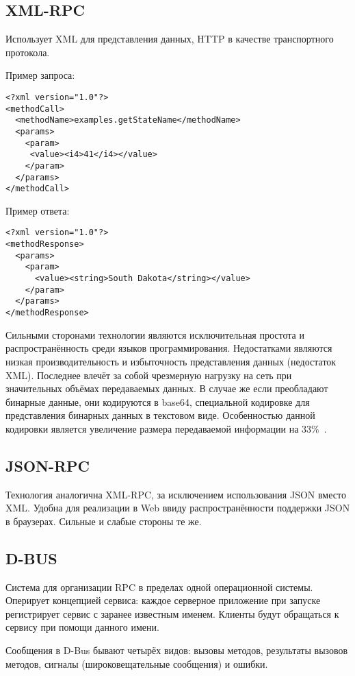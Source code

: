 \subsection{XML-RPC}
Использует XML для представления данных, HTTP в качестве транспортного протокола.

\noindent Пример запроса:
\begin{verbatim}
<?xml version="1.0"?>
<methodCall>
  <methodName>examples.getStateName</methodName>
  <params>
    <param>
     <value><i4>41</i4></value>
    </param>
  </params>
</methodCall>
\end{verbatim}

\noindent Пример ответа:
\begin{verbatim}
<?xml version="1.0"?>
<methodResponse>
  <params>
    <param>
      <value><string>South Dakota</string></value>
    </param>
  </params>
</methodResponse>
\end{verbatim}

Сильными сторонами технологии являются исключительная простота
и распространённость среди языков программирования. Недостатками являются
низкая производительность и избыточность представления данных (недостаток XML).
Последнее влечёт за собой чрезмерную нагрузку на сеть при значительных объёмах
передаваемых данных. В случае же если преобладают бинарные данные,
они кодируются в base64, специальной кодировке для представления бинарных
данных в текстовом виде. Особенностью данной кодировки является увеличение
размера передаваемой информации на 33\%~\cite{base64rfc}.

\subsection{JSON-RPC}
Технология аналогична XML-RPC, за исключением использования JSON вместо XML.
Удобна для реализации в Web ввиду распространённости поддержки JSON
в браузерах. Сильные и слабые стороны те же.

\subsection{D-BUS}
Система для организации RPC в пределах одной операционной системы.
Оперирует концепцией сервиса: каждое серверное приложение при запуске
регистрирует сервис с заранее известным именем. Клиенты будут обращаться
к сервису при помощи данного имени.

Сообщения в D-Bus бывают четырёх видов: вызовы методов, результаты вызовов методов, сигналы (широковещательные сообщения) и ошибки.

